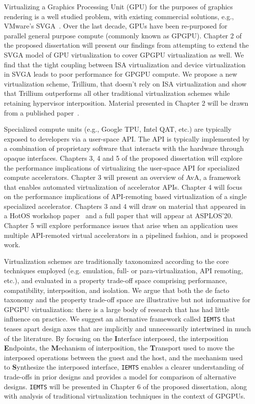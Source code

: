 Virtualizing a Graphics Processing Unit (GPU) for the purposes of graphics
rendering is a well studied problem, with existing commercial solutions, e.g.,
VMware’s SVGA~\cite{dowty2009gpu}. Over the last decade, GPUs have been
re-purposed for parallel general purpose compute (commonly known as GPGPU).
Chapter 2 of the proposed dissertation will present our findings from
attempting to extend the SVGA model of GPU virtualization to cover GPGPU
virtualization as well. We find that the tight coupling between ISA
virtualization and device virtualization in SVGA leads to poor performance for
GPGPU compute. We propose a new virtualization scheme, Trillium, that doesn’t
rely on ISA virtualization and show that Trillium outperforms all other
traditional virtualization schemes while retaining hypervisor interposition.
Material presented in Chapter 2 will be drawn from a published paper~\cite{trillium}.

Specialized compute units (e.g., Google TPU, Intel QAT, etc.) are
typically exposed to developers via a user-space API. The API is typically
implemented by a combination of proprietary software that interacts with the
hardware through opaque interfaces.
Chapters 3, 4 and 5 of the proposed dissertation will explore the performance
implications of virtualizing the user-space API for specialized compute
accelerators.
Chapter 3 will present an overview of AvA, a framework that enables automated
virtualization of accelerator APIs. Chapter 4 will focus on the performance
implications of API-remoting based virtualization of a single specialized
accelerator. Chapters 3 and 4 will draw on material that appeared in a HotOS
workshop paper~\cite{ava-hotos} and a full paper that will appear at
ASPLOS'20. Chapter 5 will explore performance issues that arise when an
application uses multiple API-remoted virtual accelerators in a pipelined
fashion, and is proposed work.

Virtualization schemes are traditionally taxonomized according to the core
techniques employed (e.g. emulation, full- or para-virtualization, API
remoting, etc.), and evaluated in a property trade-off space comprising
performance, compatibility, interposition, and isolation. We argue that both
the de facto taxonomy and the property trade-off space are illustrative but
not informative for GPGPU virtualization: there is a large body of research
that has had little influence on practice. We suggest an alternative framework
called \texttt{IEMTS} that teases apart design axes that are implicitly and
unnecessarily intertwined in much of the literature. By focusing on the
\textbf{I}nterface interposed, the interposition \textbf{E}ndpoints, the
\textbf{M}echanism of interposition, the \textbf{T}ransport used to move the
interposed operations between the guest and the host, and the mechanism used
to \textbf{S}ynthesize the interposed interface, \texttt{IEMTS} enables a
clearer understanding of trade-offs in prior designs and provides a model for
comparison of alternative designs. \texttt{IEMTS} will be presented in Chapter
6 of the proposed dissertation, along with analysis of traditional
virtualization techniques in the context of GPGPUs.

